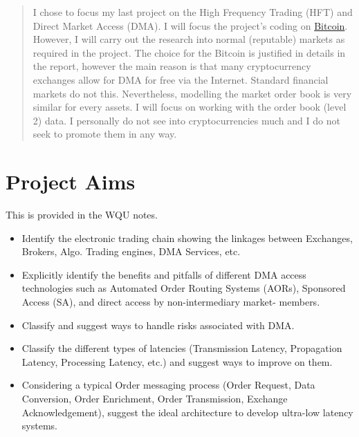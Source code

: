 \documentclass[12pt]{article}
\begin{document}
\maketitle

\begin{abstract}
I chose to focus my last project on the High Frequency Trading (HFT) and Direct Market Access (DMA). I will focus the project's coding on
\href{https://bitcoin.org/en/}{Bitcoin}. However, I will carry out the research into normal (reputable) markets as required in the project. The choice for the Bitcoin is justified in details in the report, however the main reason is that many cryptocurrency exchanges allow for DMA for free via the Internet. Standard financial markets do not this. Nevertheless, modelling the market order book is very similar for every assets. I will focus on working with the order book (level 2) data. I personally do not see into cryptocurrencies much and I do not seek to promote them in any way.
\end{abstract}


\section{Project Aims}
\label{sec:Aims}
This is provided in the WQU notes.
\begin{itemize}
\item Identify the electronic trading chain showing the linkages between
Exchanges, Brokers, Algo. Trading engines, DMA Services, etc.
\item Explicitly identify the benefits and pitfalls of different DMA access
technologies such as Automated Order Routing Systems (AORs),
Sponsored Access (SA), and direct access by non-intermediary market-
members.
\item Classify and suggest ways to handle risks associated with DMA.
\item Classify the different types of latencies (Transmission Latency,
Propagation Latency, Processing Latency, etc.) and suggest ways to
improve on them.
\item Considering a typical Order messaging process (Order Request, Data
Conversion, Order Enrichment, Order Transmission, Exchange
Acknowledgement), suggest the ideal architecture to develop ultra-low
latency systems.
\end{itemize}
\end{document}
